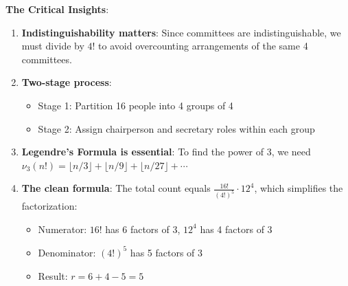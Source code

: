 \documentclass[12pt]{article}
\begin{document}
\begin{keyinsightbox}
\textbf{The Critical Insights}:

\begin{enumerate}
    \item \textbf{Indistinguishability matters}: Since committees are indistinguishable, we must divide by $4!$ to avoid overcounting arrangements of the same 4 committees.
    
    \item \textbf{Two-stage process}: 
    \begin{itemize}
        \item Stage 1: Partition 16 people into 4 groups of 4
        \item Stage 2: Assign chairperson and secretary roles within each group
    \end{itemize}
    
    \item \textbf{Legendre's Formula is essential}: To find the power of 3, we need $\nu_3(n!) = \lfloor n/3 \rfloor + \lfloor n/9 \rfloor + \lfloor n/27 \rfloor + \cdots$
    
    \item \textbf{The clean formula}: The total count equals $\frac{16!}{(4!)^5} \cdot 12^4$, which simplifies the factorization:
    \begin{itemize}
        \item Numerator: $16!$ has 6 factors of 3, $12^4$ has 4 factors of 3
        \item Denominator: $(4!)^5$ has 5 factors of 3
        \item Result: $r = 6 + 4 - 5 = 5$
    \end{itemize}
\end{enumerate}
\end{keyinsightbox}
\end{document}
